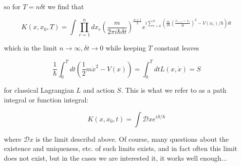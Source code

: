 \documentclass{article}
\theoremstyle{definition}
\begin{document}
so for $T = n \delta t$ we find that

\begin{equation}
  K(x, x_0, T) = \int \prod_{r = 1}^n dx_r \left( \frac{m}{2\pi i \hbar \delta t} \right)^{\frac{n + 1}{2}}
  e^{i \sum_{r = 0}^n \left( \frac{m}{2 \hbar} \left( \frac{x_{r + 1} - x_r}{\delta t} \right)^2
      - V(x_r) / \hbar \right) \delta t}
\end{equation}

which in the limit $n \to \infty, \delta t \to 0$ while keeping $T$ constant
leaves

\begin{equation}
  \frac{1}{\hbar} \int_0^T dt \left( \frac{1}{2}m \dot{x}^2 - V(x) \right) = \int_0^T dt L(x, \dot{x}) = S
\end{equation}

for classical Lagrangian $L$ and action $S$. This is what we refer to as a path
integral or function integral:

\begin{equation}
  K(x, x_0, t) = \int \mathcal{D}x e^{i S / \hbar}
\end{equation}

where $\mathcal{D} x$ is the limit describd above. Of course, many questions
about the existence and uniqueness, etc. of such limits exists, and in fact
often this limit does not exist, but in the cases we are interested it, it works
well enough...
\end{document}
